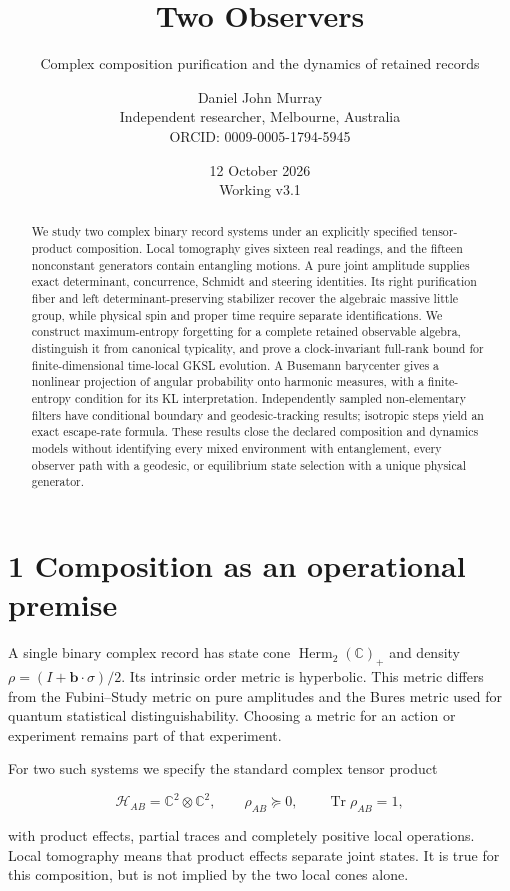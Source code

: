 \documentclass[
  11pt,
  a4paper,
]{article}
\title{Two Observers}
\subtitle{Complex composition purification and the dynamics of retained records}
\author{Daniel John Murray\\{\small Independent researcher, Melbourne, Australia}\\{\small ORCID: 0009-0005-1794-5945}}
\date{12 October 2026\\{\small Working v3.1}}
\begin{document}
\maketitle
\begin{abstract}
We study two complex binary record systems under an explicitly specified tensor-product composition. Local tomography gives sixteen real readings, and the fifteen nonconstant generators contain entangling motions. A pure joint amplitude supplies exact determinant, concurrence, Schmidt and steering identities. Its right purification fiber and left determinant-preserving stabilizer recover the algebraic massive little group, while physical spin and proper time require separate identifications. We construct maximum-entropy forgetting for a complete retained observable algebra, distinguish it from canonical typicality, and prove a clock-invariant full-rank bound for finite-dimensional time-local GKSL evolution. A Busemann barycenter gives a nonlinear projection of angular probability onto harmonic measures, with a finite-entropy condition for its KL interpretation. Independently sampled non-elementary filters have conditional boundary and geodesic-tracking results; isotropic steps yield an exact escape-rate formula. These results close the declared composition and dynamics models without identifying every mixed environment with entanglement, every observer path with a geodesic, or equilibrium state selection with a unique physical generator.
\end{abstract}

\section{1 Composition as an operational premise}\label{composition-as-an-operational-premise}

A single binary complex record has state cone \(\operatorname{Herm}_2(\mathbb C)_+\) and density \(\rho=(I+\mathbf b\cdot\sigma)/2\). Its intrinsic order metric is hyperbolic. This metric differs from the Fubini--Study metric on pure amplitudes and the Bures metric used for quantum statistical distinguishability. Choosing a metric for an action or experiment remains part of that experiment.

For two such systems we specify the standard complex tensor product

\[\mathcal H_{AB}=\mathbb C^2\otimes\mathbb C^2,\qquad
\rho_{AB}\succeq0,\qquad \operatorname{Tr}\rho_{AB}=1,\]

with product effects, partial traces and completely positive local operations. Local tomography means that product effects separate joint states. It is true for this composition, but is not implied by the two local cones alone.
\end{document}
